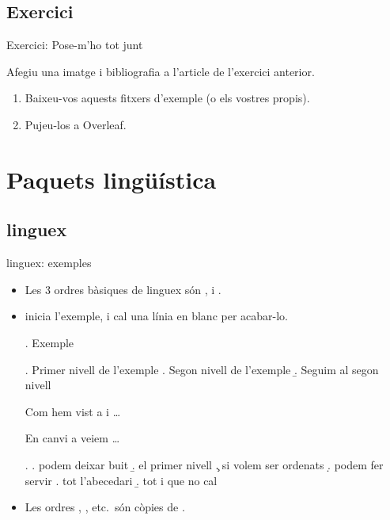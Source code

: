 \subsection{Exercici}
\begin{frame}[fragile]{Exercici: Pose-m'ho tot junt}

Afegiu una imatge i bibliografia a l'article de l'exercici anterior.

\begin{enumerate}
\item Baixeu-vos aquests fitxers d'exemple (o els vostres propis).

\begin{center}

\end{center}

\item Pujeu-los a Overleaf.

\end{enumerate}
\end{frame}

\section{Paquets lingüística}
\subsection{linguex}
\begin{frame}[fragile]{linguex: exemples}
\begin{itemize}
\item Les 3 ordres bàsiques de linguex són ,  i .
\item {} inicia l'exemple, i cal una línia en blanc per acabar-lo.
\begin{exampletwouptiny2}
\ex. Exemple

\ex. Primer nivell de l'exemple
\a. Segon nivell de l'exemple
\b. Seguim al segon nivell

Com hem vist a \LLast i \Last \dots

En canvi a \Next veiem \dots

\ex.
\a. podem deixar buit
\b. el primer nivell
\c. si volem ser ordenats
\d. podem fer servir
\e. tot l'abecedari
\b. tot i que no cal

\end{exampletwouptiny2}
\item Les ordres , , etc.~són còpies de .
\end{itemize}
\end{frame}

